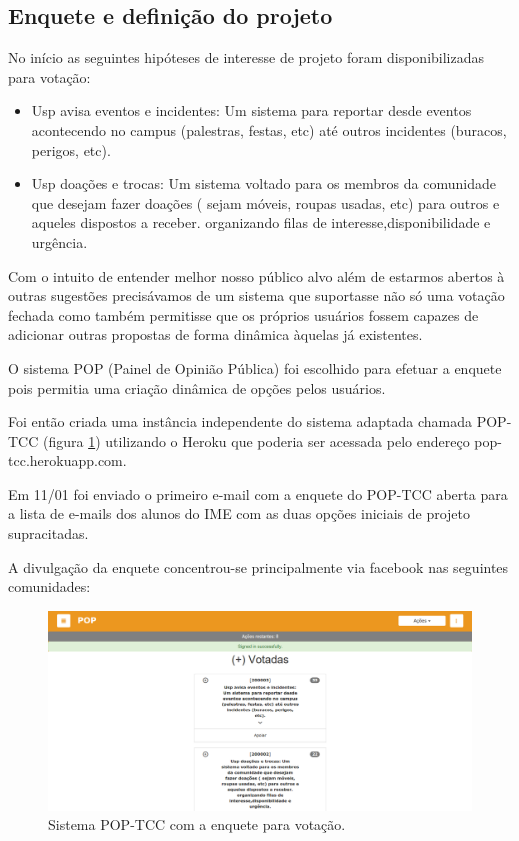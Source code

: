 \subsection{Enquete e definição do projeto}
        \par  No início as seguintes hipóteses de interesse de projeto foram disponibilizadas para votação:
                \begin{itemize}
                \item {Usp avisa eventos e incidentes:} Um sistema para reportar desde eventos acontecendo no campus (palestras, festas, etc) até outros incidentes (buracos, perigos, etc).
                \item {Usp doações e trocas: } Um sistema voltado para os membros da comunidade que desejam fazer doações ( sejam móveis, roupas usadas, etc) para outros e aqueles dispostos a receber. organizando filas de interesse,disponibilidade e urgência.
                \end{itemize}
        \par Com o intuito de entender melhor nosso público alvo além de estarmos abertos à outras sugestões precisávamos de um sistema que suportasse não só uma votação fechada como também permitisse que os próprios usuários fossem capazes de adicionar outras propostas de forma dinâmica àquelas já existentes.
        \par O  sistema POP (Painel de Opinião Pública) foi escolhido para efetuar a enquete pois permitia uma criação dinâmica de opções pelos usuários.
        \par Foi então criada uma instância independente do sistema adaptada chamada POP-TCC (figura \ref{fig:pop-tcc}) utilizando o Heroku que poderia ser acessada pelo endereço pop-tcc.herokuapp.com. 
        \par Em 11/01 foi enviado o primeiro e-mail com a enquete do POP-TCC aberta para a lista de e-mails dos alunos do IME com as duas opções iniciais de projeto supracitadas. \par A divulgação da enquete concentrou-se principalmente via facebook nas seguintes comunidades:
\begin{figure}[htb]
\includegraphics[width=15cm]{figuras/pop-tcc}
\caption{\label{fig:pop-tcc} Sistema POP-TCC com a enquete para votação.}
\end{figure}
